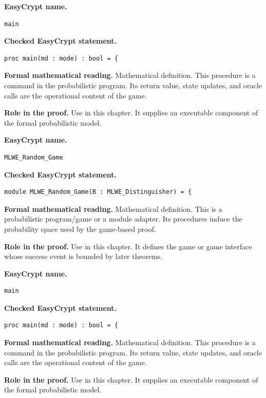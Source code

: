 \begin{formaldefinition}
\noindent\textbf{EasyCrypt name.}
\begin{lstlisting}[language=EasyCrypt,basicstyle=\ttfamily\scriptsize]
main
\end{lstlisting}
\noindent\textbf{Checked EasyCrypt statement.}
\begin{lstlisting}[language=EasyCrypt,basicstyle=\ttfamily\scriptsize]
proc main(md : mode) : bool = {
\end{lstlisting}
\noindent\textbf{Formal mathematical reading.}
Mathematical definition. This procedure is a command in the probabilistic program.  Its return value, state updates, and oracle calls are the operational content of the game.

\noindent\textbf{Role in the proof.}
Use in this chapter. It supplies an executable component of the formal probabilistic model.

\end{formaldefinition}

\begin{formaldefinition}
\noindent\textbf{EasyCrypt name.}
\begin{lstlisting}[language=EasyCrypt,basicstyle=\ttfamily\scriptsize]
MLWE_Random_Game
\end{lstlisting}
\noindent\textbf{Checked EasyCrypt statement.}
\begin{lstlisting}[language=EasyCrypt,basicstyle=\ttfamily\scriptsize]
module MLWE_Random_Game(B : MLWE_Distinguisher) = {
\end{lstlisting}
\noindent\textbf{Formal mathematical reading.}
Mathematical definition. This is a probabilistic program/game or a module adapter.  Its procedures induce the probability space used by the game-based proof.

\noindent\textbf{Role in the proof.}
Use in this chapter. It defines the game or game interface whose success event is bounded by later theorems.

\end{formaldefinition}

\begin{formaldefinition}
\noindent\textbf{EasyCrypt name.}
\begin{lstlisting}[language=EasyCrypt,basicstyle=\ttfamily\scriptsize]
main
\end{lstlisting}
\noindent\textbf{Checked EasyCrypt statement.}
\begin{lstlisting}[language=EasyCrypt,basicstyle=\ttfamily\scriptsize]
proc main(md : mode) : bool = {
\end{lstlisting}
\noindent\textbf{Formal mathematical reading.}
Mathematical definition. This procedure is a command in the probabilistic program.  Its return value, state updates, and oracle calls are the operational content of the game.

\noindent\textbf{Role in the proof.}
Use in this chapter. It supplies an executable component of the formal probabilistic model.

\end{formaldefinition}

